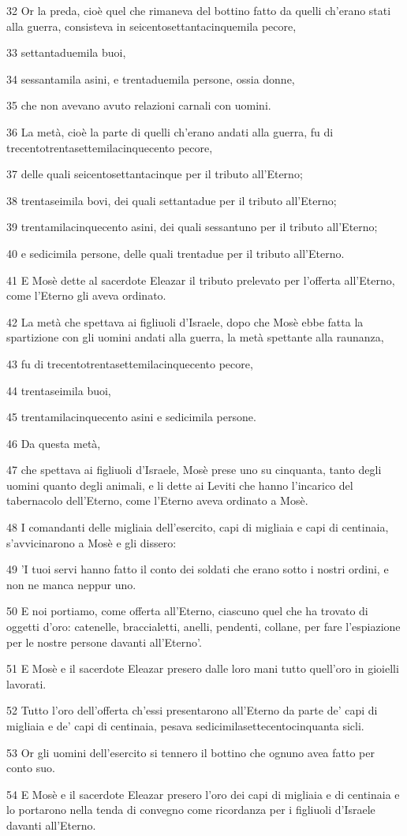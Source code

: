 \par 32 Or la preda, cioè quel che rimaneva del bottino fatto da quelli ch'erano stati alla guerra, consisteva in seicentosettantacinquemila pecore,
\par 33 settantaduemila buoi,
\par 34 sessantamila asini, e trentaduemila persone, ossia donne,
\par 35 che non avevano avuto relazioni carnali con uomini.
\par 36 La metà, cioè la parte di quelli ch'erano andati alla guerra, fu di trecentotrentasettemilacinquecento pecore,
\par 37 delle quali seicentosettantacinque per il tributo all'Eterno;
\par 38 trentaseimila bovi, dei quali settantadue per il tributo all'Eterno;
\par 39 trentamilacinquecento asini, dei quali sessantuno per il tributo all'Eterno;
\par 40 e sedicimila persone, delle quali trentadue per il tributo all'Eterno.
\par 41 E Mosè dette al sacerdote Eleazar il tributo prelevato per l'offerta all'Eterno, come l'Eterno gli aveva ordinato.
\par 42 La metà che spettava ai figliuoli d'Israele, dopo che Mosè ebbe fatta la spartizione con gli uomini andati alla guerra, la metà spettante alla raunanza,
\par 43 fu di trecentotrentasettemilacinquecento pecore,
\par 44 trentaseimila buoi,
\par 45 trentamilacinquecento asini e sedicimila persone.
\par 46 Da questa metà,
\par 47 che spettava ai figliuoli d'Israele, Mosè prese uno su cinquanta, tanto degli uomini quanto degli animali, e li dette ai Leviti che hanno l'incarico del tabernacolo dell'Eterno, come l'Eterno aveva ordinato a Mosè.
\par 48 I comandanti delle migliaia dell'esercito, capi di migliaia e capi di centinaia, s'avvicinarono a Mosè e gli dissero:
\par 49 'I tuoi servi hanno fatto il conto dei soldati che erano sotto i nostri ordini, e non ne manca neppur uno.
\par 50 E noi portiamo, come offerta all'Eterno, ciascuno quel che ha trovato di oggetti d'oro: catenelle, braccialetti, anelli, pendenti, collane, per fare l'espiazione per le nostre persone davanti all'Eterno'.
\par 51 E Mosè e il sacerdote Eleazar presero dalle loro mani tutto quell'oro in gioielli lavorati.
\par 52 Tutto l'oro dell'offerta ch'essi presentarono all'Eterno da parte de' capi di migliaia e de' capi di centinaia, pesava sedicimilasettecentocinquanta sicli.
\par 53 Or gli uomini dell'esercito si tennero il bottino che ognuno avea fatto per conto suo.
\par 54 E Mosè e il sacerdote Eleazar presero l'oro dei capi di migliaia e di centinaia e lo portarono nella tenda di convegno come ricordanza per i figliuoli d'Israele davanti all'Eterno.

